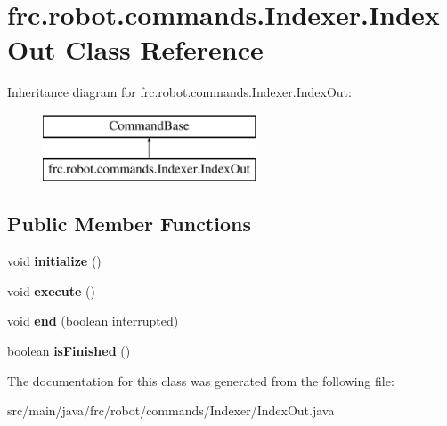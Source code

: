 \hypertarget{classfrc_1_1robot_1_1commands_1_1_indexer_1_1_index_out}{}\section{frc.\+robot.\+commands.\+Indexer.\+Index\+Out Class Reference}
\label{classfrc_1_1robot_1_1commands_1_1_indexer_1_1_index_out}
Inheritance diagram for frc.\+robot.\+commands.\+Indexer.\+Index\+Out\+:\begin{figure}[H]
\begin{center}
\leavevmode
\includegraphics[height=2.000000cm]{classfrc_1_1robot_1_1commands_1_1_indexer_1_1_index_out}
\end{center}
\end{figure}
\subsection*{Public Member Functions}
\begin{DoxyCompactItemize}
\item 
\mbox{\label{classfrc_1_1robot_1_1commands_1_1_indexer_1_1_index_out_acb5f3bb7aaac65fad40f27785b5d261f}} 
void {\bfseries initialize} ()
\item 
\mbox{\label{classfrc_1_1robot_1_1commands_1_1_indexer_1_1_index_out_ae775233137aa081f9d9db4a1c895d202}} 
void {\bfseries execute} ()
\item 
\mbox{\label{classfrc_1_1robot_1_1commands_1_1_indexer_1_1_index_out_a6c5252a33613c7474873cfc86dd8e877}} 
void {\bfseries end} (boolean interrupted)
\item 
\mbox{\label{classfrc_1_1robot_1_1commands_1_1_indexer_1_1_index_out_ad7620f7f465280d6492b7d13e22ab101}} 
boolean {\bfseries is\+Finished} ()
\end{DoxyCompactItemize}


The documentation for this class was generated from the following file\+:\begin{DoxyCompactItemize}
\item 
src/main/java/frc/robot/commands/\+Indexer/Index\+Out.\+java\end{DoxyCompactItemize}
